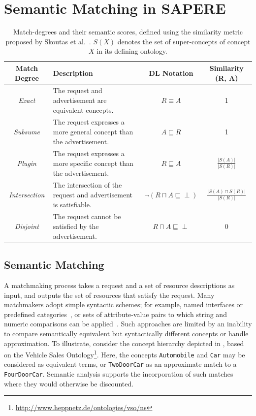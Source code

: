 \documentclass[12pt,a4paper,twoside,openright]{book}
\begin{document}
\section{Semantic Matching in SAPERE}
\label{sec:semantic_matching}
\begin{table}
\centering
\begin{tabular}{| c || p{6cm} | c | c |}\hline
\textbf{Match Degree}        &\textbf{Description}	&\textbf{DL Notation}  &\textbf{Similarity (R, A)} \\\hline
\emph{Exact}	&The request and advertisement are equivalent concepts.	&$R \equiv A$	&1		\\\hline
\emph{Subsume}	&The request expresses a more general concept than the advertisement.	&$A \sqsubseteq R$	&1		\\\hline
\emph{Plugin}	&The request expresses a more specific concept than the advertisement.	&$R \sqsubseteq A$	&$\frac{|S(A)|}{|S(R)|}$		\\\hline
\emph{Intersection}	&The intersection of the request and advertisement is satisfiable.	&$\neg (R \sqcap A \sqsubseteq \perp)$	&$\frac{|S(A)\sqcap S(R)|}{|S(R)|}$		\\\hline
\emph{Disjoint}	&The request cannot be satisfied by the advertisement.	&$R \sqcap A \sqsubseteq \perp$	&0		\\\hline
\end{tabular}
\caption[Match-degrees and their semantic scores]{Match-degrees and their semantic scores, defined using the similarity metric proposed by Skoutas et al.~\cite{skoutas2007raking}. $S(X)$ denotes the set of super-concepts of concept $X$ in its defining ontology.}
\vspace{-10pt}
\label{tab:match_degrees}
\end{table}

\subsection{Semantic Matching}
A matchmaking process takes a request and a set of resource descriptions as input, and outputs the set of resources that satisfy the request.
%
Many matchmakers adopt simple syntactic schemes; for example, named interfaces or predefined categories~\cite{waldo2000jini}, or sets of attribute-value pairs to which string and numeric comparisons can be applied~\cite{guttman1999service}.
%
Such approaches are limited by an inability to compare semantically equivalent but syntactically different concepts or handle approximation.
%
To illustrate, consider the concept hierarchy depicted in , based on the Vehicle Sales Ontology\footnote{\url{http://www.heppnetz.de/ontologies/vso/ns}}.
%
Here, the concepts  \texttt{Automobile} and \texttt{Car} may be considered as equivalent terms, or \texttt{TwoDoorCar} as an approximate match to a \texttt{FourDoorCar}.
%
Semantic analysis supports the incorporation of such matches where they would otherwise be discounted.
\end{document}
